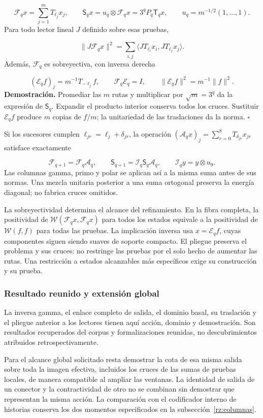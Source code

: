 \[
\mathcal F_qx=\sum_{j=1}^mT_{\ell_j}x_j,\qquad
\mathsf S_qx=u_q\otimes\mathcal F_qx=3^qP_q\mathsf T_qx,
\qquad u_q=m^{-1/2}(1,\ldots,1).
\]
Para todo lector lineal \(J\) definido sobre esas pruebas,

\[
\|J\mathcal F_qx\|^2
=\sum_{i,j}\langle JT_{\ell_i}x_i,JT_{\ell_j}x_j\rangle.
\]
Además, \(\mathcal F_q\) es sobreyectiva, con inversa derecha

\[
(\mathcal E_qf)_j=m^{-1}T_{-\ell_j}f,\qquad
\mathcal F_q\mathcal E_q=I,\qquad
\|\mathcal E_qf\|^2=m^{-1}\|f\|^2.
\]
\textbf{Demostración.} Promediar las \(m\) rutas y multiplicar por \(\sqrt m=3^q\) da la expresión de \(\mathsf S_q\). Expandir el producto interior conserva todos los cruces. Sustituir \(\mathcal E_qf\) produce \(m\) copias de \(f/m\); la unitariedad de las traslaciones da la norma. \hfill\(\square\)

Si los sucesores cumplen \(\ell_{jr}=\ell_j+\delta_{jr}\), la operación \((\mathcal A_qx)_j=\sum_{r=0}^8T_{\delta_{jr}}x_{jr}\) satisface exactamente

\[
\mathcal F_{q+1}=\mathcal F_q\mathcal A_q,\qquad
\mathsf S_{q+1}=\mathcal I_q\mathsf S_q\mathcal A_q,\qquad
\mathcal I_qy=y\otimes u_9.
\]
Las columnas gamma, primo y polar se aplican así a la misma suma antes de sus normas. Una mezcla unitaria posterior a una suma ortogonal preserva la energía diagonal; no fabrica cruces omitidos.

La sobreyectividad determina el alcance del refinamiento. En la fibra completa, la positividad de \(\mathscr W(\mathcal F_qx,\mathcal F_qx)\) para todos los estados equivale a la positividad de \(\mathscr W(f,f)\) para todas las pruebas. La implicación inversa usa \(x=\mathcal E_qf\), cuyas componentes siguen siendo suaves de soporte compacto. El pliegue preserva el problema y sus cruces: no restringe las pruebas por el solo hecho de aumentar las rutas. Una restricción a estados alcanzables más específicos exige su construcción y su prueba.

\subsubsection*{Resultado reunido y extensión global}
La inversa gamma, el enlace completo de salida, el dominio basal, su traslación y el pliegue anterior a los lectores tienen aquí acción, dominio y demostración. Son resultados recuperados del corpus y formalizaciones reunidas, no descubrimientos atribuidos retrospectivamente.

Para el alcance global solicitado resta demostrar la cota de esa misma salida sobre toda la imagen efectiva, incluidos los cruces de las sumas de pruebas locales, de manera compatible al ampliar las ventanas. La identidad de salida de un conector y la contractividad de otro no se combinan sin demostrar que representan la misma acción. La comparación con el codificador interno de historias conserva los dos momentos especificados en la subsección~\ref{rz:columnas}.

